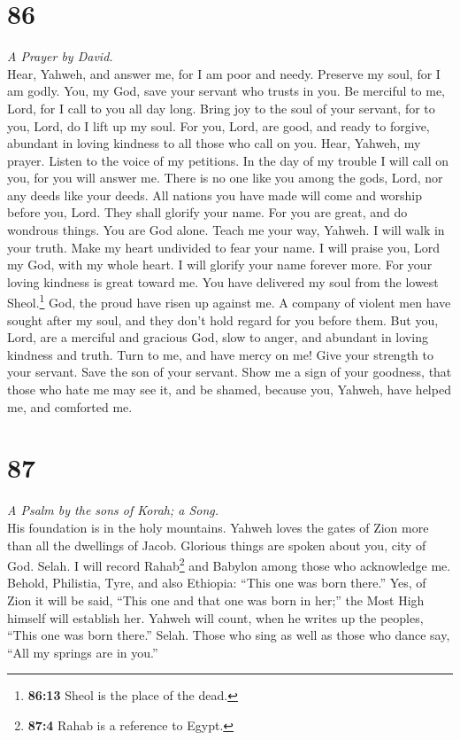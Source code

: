 \hypertarget{section-85}{%
\section{86}\label{section-85}}

\emph{A Prayer by David.}\\
 Hear, Yahweh, and answer me, for I am poor and needy.
 Preserve my soul, for I am godly. You, my God, save your
servant who trusts in you.  Be merciful to me, Lord, for I
call to you all day long.  Bring joy to the soul of your
servant, for to you, Lord, do I lift up my soul.  For you,
Lord, are good, and ready to forgive, abundant in loving kindness to all
those who call on you.  Hear, Yahweh, my prayer. Listen to
the voice of my petitions.  In the day of my trouble I
will call on you, for you will answer me.  There is no one
like you among the gods, Lord, nor any deeds like your deeds.
 All nations you have made will come and worship before
you, Lord. They shall glorify your name.  For you are
great, and do wondrous things. You are God alone.  Teach
me your way, Yahweh. I will walk in your truth. Make my heart undivided
to fear your name.  I will praise you, Lord my God, with
my whole heart. I will glorify your name forever more. 
For your loving kindness is great toward me. You have delivered my soul
from the lowest Sheol.\footnote{\textbf{86:13} Sheol is the place of the
  dead.}  God, the proud have risen up against me. A
company of violent men have sought after my soul, and they don't hold
regard for you before them.  But you, Lord, are a
merciful and gracious God, slow to anger, and abundant in loving
kindness and truth.  Turn to me, and have mercy on me!
Give your strength to your servant. Save the son of your servant.
 Show me a sign of your goodness, that those who hate me
may see it, and be shamed, because you, Yahweh, have helped me, and
comforted me.

\hypertarget{section-86}{%
\section{87}\label{section-86}}

\emph{A Psalm by the sons of Korah; a Song.}\\
 His foundation is in the holy mountains. 
Yahweh loves the gates of Zion more than all the dwellings of Jacob.
 Glorious things are spoken about you, city of God. Selah.
 I will record Rahab\footnote{\textbf{87:4} Rahab is a
  reference to Egypt.} and Babylon among those who acknowledge me.
Behold, Philistia, Tyre, and also Ethiopia: ``This one was born there.''
 Yes, of Zion it will be said, ``This one and that one was
born in her;'' the Most High himself will establish her. 
Yahweh will count, when he writes up the peoples, ``This one was born
there.'' Selah.  Those who sing as well as those who dance
say, ``All my springs are in you.''

